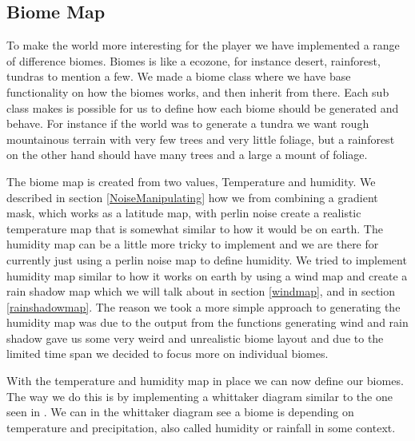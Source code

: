 \subsection{Biome Map}

To make the world more interesting for the player we have implemented a range of difference biomes. Biomes is like a ecozone, for instance desert, rainforest, tundras to mention a few. We made a biome class where we have base functionality on how the biomes works, and then inherit from there. Each sub class makes is possible for us to define how each biome should be generated and behave. For instance if the world was to generate a tundra we want rough mountainous terrain with very few trees and very little foliage, but a rainforest on the other hand should have many trees and a large a mount of foliage.

The biome map is created from two values, Temperature and humidity. We described in section \ref{NoiseManipulating} how we from combining a gradient mask, which works as a latitude map, with perlin noise create a realistic temperature map that is somewhat similar to how it would be on earth. The humidity map can be a little more tricky to implement and we are there for currently just using a perlin noise map to define humidity. We tried to implement humidity map similar to how it works on earth by using a wind map and create a rain shadow map which we will talk about in section \ref{windmap}, and in section \ref{rainshadowmap}. The reason we took a more simple approach to generating the humidity map was due to the output from the functions generating wind and rain shadow gave us some very weird and unrealistic biome layout and due to the limited time span we decided to focus more on individual biomes.

With the temperature and humidity map in place we can now define our biomes. The way we do this is by implementing a whittaker diagram similar to the one seen in . We can in the whittaker diagram see a biome is depending on temperature and precipitation, also called humidity or rainfall in some context.

